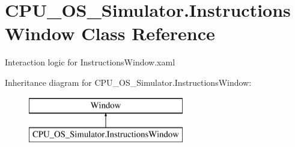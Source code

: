 \hypertarget{class_c_p_u___o_s___simulator_1_1_instructions_window}{}\section{C\+P\+U\+\_\+\+O\+S\+\_\+\+Simulator.\+Instructions\+Window Class Reference}
\label{class_c_p_u___o_s___simulator_1_1_instructions_window}


Interaction logic for Instructions\+Window.\+xaml  


Inheritance diagram for C\+P\+U\+\_\+\+O\+S\+\_\+\+Simulator.\+Instructions\+Window\+:\begin{figure}[H]
\begin{center}
\leavevmode
\includegraphics[height=2.000000cm]{class_c_p_u___o_s___simulator_1_1_instructions_window}
\end{center}
\end{figure}
